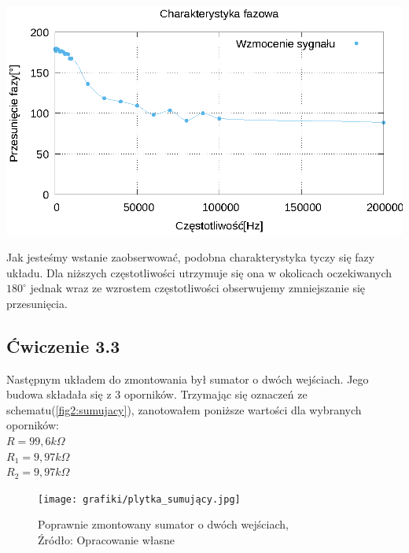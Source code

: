 \documentclass{article}
\begin{document}
\begin{table}[!ht]
\begin{minipage}{.5\textwidth}
        \end{minipage}%
        \begin{minipage}{.5\textwidth}
          \centering
          \includegraphics[scale=0.75]{grafiki/phase_plot.eps}
        \end{minipage}
      \end{table}

      Jak jesteśmy wstanie zaobserwować, podobna charakterystyka tyczy się fazy układu. Dla niższych częstotliwości utrzymuje się ona w okolicach oczekiwanych $180^\circ$ jednak wraz ze wzrostem częstotliwości obserwujemy zmniejszanie się przesunięcia.

    \subsection{Ćwiczenie 3.3}
      Następnym układem do zmontowania był sumator o dwóch wejściach. Jego budowa składała się z 3 oporników. Trzymając się oznaczeń ze schematu(\ref{fig2:sumujacy}), zanotowałem poniższe wartości dla wybranych oporników:\\
      $R = 99,6k\Omega$ \\
      $R_1 = 9,97k\Omega$ \\
      $R_2 = 9,97k\Omega$ \\

      \begin{figure}[!ht]
        \centering
        \texttt{[image: grafiki/plytka\_sumujący.jpg]}
        \caption{Poprawnie zmontowany sumator o dwóch wejściach,
        \\Źródło: Opracowanie własne}
      \end{figure}
\end{document}

